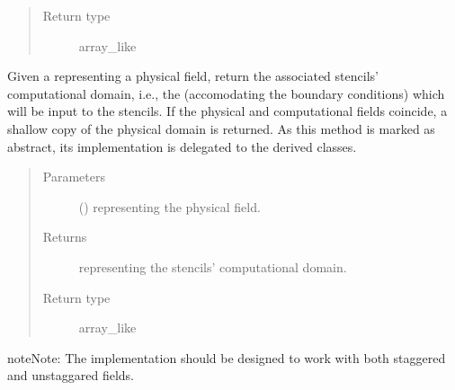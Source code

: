 \documentclass[letterpaper,10pt,english]{sphinxmanual}
\begin{document}
\begin{fulllineitems}
\begin{fulllineitems}
\begin{quote}
\begin{description}
\item[{Return type}] \leavevmode
array\_like

\end{description}\end{quote}

\end{fulllineitems}


\begin{fulllineitems}
\label{\detokenize{api:dycore.horizontal_boundary.HorizontalBoundary.from_physical_to_computational_domain}}
Given a  representing a physical field, return the associated stencils’ computational
domain, i.e., the  (accomodating the boundary conditions) which will be input
to the stencils. If the physical and computational fields coincide, a shallow copy of the physical
domain is returned.
As this method is marked as abstract, its implementation is delegated to the derived classes.
\begin{quote}\begin{description}
\item[{Parameters}] \leavevmode
{} () \textendash{}  representing the physical field.

\item[{Returns}] \leavevmode
{} representing the stencils’ computational domain.

\item[{Return type}] \leavevmode
array\_like

\end{description}\end{quote}

\begin{sphinxadmonition}{note}{Note:}
The implementation should be designed to work with both staggered and unstaggared fields.
\end{sphinxadmonition}


\end{fulllineitems}
\end{fulllineitems}
\end{document}
